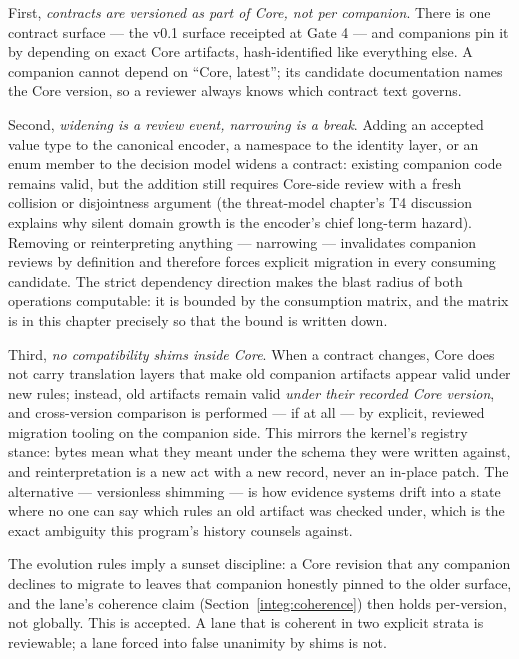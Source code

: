 First, \emph{contracts are versioned as part of Core, not per companion}. There is one contract surface --- the v0.1 surface receipted at Gate 4 --- and companions pin it by depending on exact Core artifacts, hash-identified like everything else. A companion cannot depend on ``Core, latest''; its candidate documentation names the Core version, so a reviewer always knows which contract text governs.

Second, \emph{widening is a review event, narrowing is a break}. Adding an accepted value type to the canonical encoder, a namespace to the identity layer, or an enum member to the decision model widens a contract: existing companion code remains valid, but the addition still requires Core-side review with a fresh collision or disjointness argument (the threat-model chapter's T4 discussion explains why silent domain growth is the encoder's chief long-term hazard). Removing or reinterpreting anything --- narrowing --- invalidates companion reviews by definition and therefore forces explicit migration in every consuming candidate. The strict dependency direction makes the blast radius of both operations computable: it is bounded by the consumption matrix, and the matrix is in this chapter precisely so that the bound is written down.

Third, \emph{no compatibility shims inside Core}. When a contract changes, Core does not carry translation layers that make old companion artifacts appear valid under new rules; instead, old artifacts remain valid \emph{under their recorded Core version}, and cross-version comparison is performed --- if at all --- by explicit, reviewed migration tooling on the companion side. This mirrors the kernel's registry stance: bytes mean what they meant under the schema they were written against, and reinterpretation is a new act with a new record, never an in-place patch. The alternative --- versionless shimming --- is how evidence systems drift into a state where no one can say which rules an old artifact was checked under, which is the exact ambiguity this program's history counsels against.

\begin{remark}\label{integ:rem:sunset}
The evolution rules imply a sunset discipline: a Core revision that any companion declines to migrate to leaves that companion honestly pinned to the older surface, and the lane's coherence claim (Section~\ref{integ:coherence}) then holds per-version, not globally. This is accepted. A lane that is coherent in two explicit strata is reviewable; a lane forced into false unanimity by shims is not.
\end{remark}

